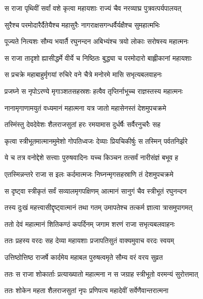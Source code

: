 \twolineshloka
{स राजा पृथिवीं सर्वां वशे कृत्वा महायशाः}
{राज्यं चैव नरव्याघ्र पुत्रवत्पर्यपालयत्} %

\twolineshloka
{सुरैश्च परमोदारैर्दैतेयैश्च महासुरैः}
{नागराक्षसगन्धर्वैर्यक्षैश्च सुमहात्मभिः} %

\twolineshloka
{पूज्यते नित्यशः सौम्य भयार्तै रघुनन्दन}
{अबिभ्यंश्च त्रयो लोकाः सरोषस्य महात्मनः} %

\twolineshloka
{स राजा तादृशो ह्यासीद्धर्मे वीर्ये च निष्ठितः}
{बुद्ध्या च परमोदारो बाह्लीकानां महायशाः} %

\twolineshloka
{स प्रचक्रे महाबाहुर्मृगयां रुचिरे वने}
{चैत्रे मनोरमे मासि सभृत्यबलवाहनः} %

\twolineshloka
{प्रजघ्ने स नृपोऽरण्ये मृगाञ्शतसहस्रशः}
{हत्वैव तृप्तिर्नाभूच्च राज्ञस्तस्य महात्मनः} %

\twolineshloka
{नानामृगाणामयुतं वध्यमानं महात्मना}
{यत्र जातो महासेनस्तं देशमुपचक्रमे} %

\twolineshloka
{तस्मिंस्तु देवदेवेशः शैलराजसुतां हरः}
{रमयामास दुर्धर्षैः सर्वैरनुचरैः सह} %

\twolineshloka
{कृत्वा स्त्रीभूतमात्मानमुमेशो गोपतिध्वजः}
{देव्याः प्रियचिकीर्षुः स तस्मिन् पर्वतनिर्झरे} %

\twolineshloka
{ये च तत्र वनोद्देशे सत्त्वाः पुरुषवादिनः}
{यच्च किञ्चन तत्सर्वं नारीसंज्ञं बभूव ह} %

\twolineshloka
{एतस्मिन्नन्तरे राजा स इलः कर्दमात्मजः}
{निघ्नन्मृगसहस्राणि तं देशमुपचक्रमे} %

\twolineshloka
{स दृष्ट्वा स्त्रीकृतं सर्वं सव्यालमृगपक्षिणम्}
{आत्मानं सानुगं चैव स्त्रीभूतं रघुनन्दन} %

\twolineshloka
{तस्य दुःखं महत्त्वासीद्दृष्ट्वात्मानं तथा गतम्}
{उमापतेश्च तत्कर्म ज्ञात्वा त्रासमुपागमत्} %

\twolineshloka
{ततो देवं महात्मानं शितिकण्ठं कपर्दिनम्}
{जगाम शरणं राजा सभृत्यबलवाहनः} %

\twolineshloka
{ततः प्रहस्य वरदः सह देव्या महायशाः}
{प्रजापतिसुतं वाक्यमुवाच वरदः स्वयम्} %

\twolineshloka
{उत्तिष्ठोत्तिष्ठ राजर्षे कार्दमेय महाबल}
{पुरुषत्वमृते सौम्य वरं वरय सुव्रत} %

\twolineshloka
{ततः स राजा शोकार्ताः प्रत्याख्यातो महात्मना}
{न स जग्राह स्त्रीभूतो वरमन्यं सुरोत्तमात्} %

\twolineshloka
{ततः शोकेन महता शैलराजसुतां नृपः}
{प्रणिपत्य महादेवीं सर्वेणैवान्तरात्मना} %

